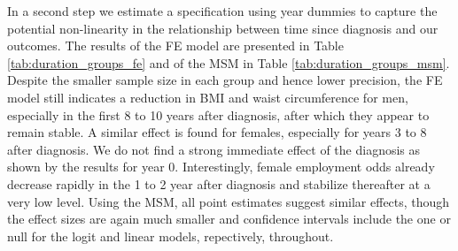 In a second step we estimate a specification using year dummies to capture the potential non-linearity in the relationship between time since diagnosis and our outcomes. The results of the \ac{FE} model are presented in Table \ref{tab:duration_groups_fe} and of the \ac{MSM} in Table \ref{tab:duration_groups_msm}. Despite the smaller sample size in each group and hence lower precision, the \ac{FE} model still indicates a reduction in \ac{BMI} and waist circumference for men, especially in the first 8 to 10 years after diagnosis, after which they appear to remain stable. A similar effect is found for females, especially for years 3 to 8 after diagnosis. We do not find a strong immediate effect of the diagnosis as shown by the results for year 0. Interestingly, female employment odds already decrease rapidly in the 1 to 2 year after diagnosis and stabilize thereafter at a very low level. Using the \ac{MSM}, all point estimates suggest similar effects, though the effect sizes are again much smaller and confidence intervals include the one or null for the logit and linear models, repectively, throughout.






